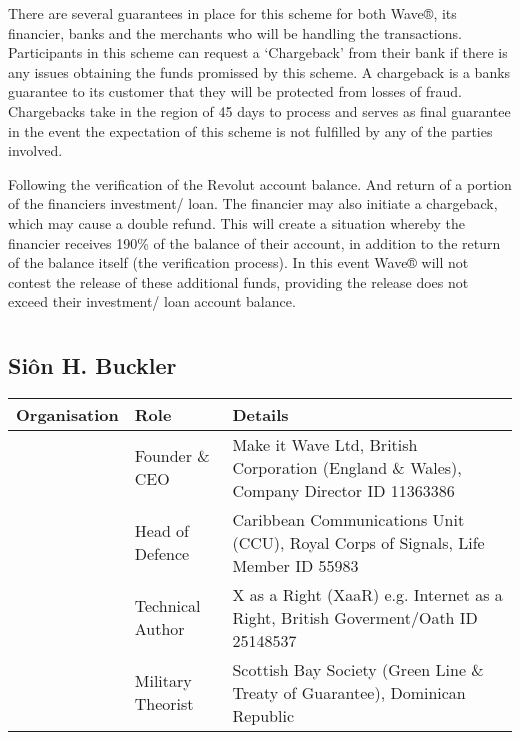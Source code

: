 \documentclass[letterpaper,10pt,openany,oneside,english]{sphinxmanual}
\begin{document}
There are several guarantees in place for this scheme for both Wave®, its financier, banks and the merchants who will be handling the transactions. Participants in this scheme can request a ‘Chargeback’ from their bank if there is any issues obtaining the funds promissed by this scheme. A chargeback is a banks guarantee to its customer that they will be protected from losses of fraud. Chargebacks take in the region of 45 days to process and serves as final guarantee in the event the expectation of this scheme is not fulfilled by any of the parties involved.

Following the verification of the Revolut account balance. And return of a portion of the financiers investment/ loan. The financier may also initiate a chargeback, which may cause a double refund. This will create a situation whereby the financier receives 190\% of the balance of their account, in addition to the return of the balance itself (the verification process). In this event Wave® will not contest the release of these additional funds, providing the release does not exceed their investment/ loan account balance.


\chapter{}
\label{\detokenize{index:document-author-s}}

\section{Siôn H. Buckler}
\label{\detokenize{index:sion-h-buckler}}

\begin{savenotes}\sphinxattablestart
\centering
\begin{tabulary}{\linewidth}[t]{|T|T|T|}
\hline
\sphinxstyletheadfamily 
Organisation
&\sphinxstyletheadfamily 
Role
&\sphinxstyletheadfamily 
Details
\\
\hline
\noindent{}
&
Founder \& CEO
&
Make it Wave Ltd, British Corporation (England \& Wales), Company Director ID 11363386
\\
\hline
\noindent{}
&
Head of Defence
&
Caribbean Communications Unit (CCU), Royal Corps of Signals, Life Member ID 55983
\\
\hline
\noindent{}
&
Technical Author
&
X as a Right (XaaR) e.g. Internet as a Right, British Goverment/Oath ID 25148537
\\
\hline
\noindent{}
&
Military Theorist
&
Scottish Bay Society (Green Line \& Treaty of Guarantee), Dominican Republic
\\
\hline
\end{tabulary}
\par
\sphinxattableend\end{savenotes}
\end{document}
